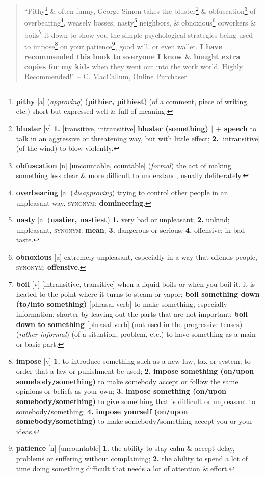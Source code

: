 \documentclass[oneside]{book}
\numberwithin{equation}{section}
\begin{document}
\begin{quotation}
	``Pithy\footnote{\textbf{pithy} [a] (\textit{approving}) (\textbf{pithier, pithiest}) (of a comment, piece of writing, etc.) short but expressed well \& full of meaning.} \& often funny, George Simon takes the bluster\footnote{\textbf{bluster} [v] \textbf{1.} [transitive, intransitive] \textbf{bluster (something) $|$ $+$ speech} to talk in an aggressive or threatening way, but with little effect; \textbf{2.} [intransitive] (of the wind) to blow violently.} \& obfuscation\footnote{\textbf{obfuscation} [n] [uncountable, countable] (\textit{formal}) the act of making something less clear \& more difficult to understand, usually deliberately.} of overbearing\footnote{\textbf{overbearing} [a] (\textit{disapproving}) trying to control other people in an unpleasant way, \textsc{synonym}: \textbf{domineering}.}, weasely bosses, nasty\footnote{\textbf{nasty} [a] (\textbf{nastier, nastiest}) \textbf{1.} very bad or unpleasant; \textbf{2.} unkind; unpleasant, \textsc{synonym}: \textbf{mean}; \textbf{3.} dangerous or serious; \textbf{4.} offensive; in bad taste.} neighbors, \& obnoxious\footnote{\textbf{obnoxious} [a] extremely unpleasant, especially in a way that offends people, \textsc{synonym}: \textbf{offensive}.} coworkers \& boils\footnote{\textbf{boil} [v] [intransitive, transitive] when a liquid boils or when you boil it, it is heated to the point where it turns to steam or vapor; \textbf{boil something down (to\texttt{/}into something)} [phrasal verb] to make something, especially information, shorter by leaving out the parts that are not important; \textbf{boil down to something} [phrasal verb] (not used in the progressive tenses) (\textit{rather informal}) (of a situation, problem, etc.) to have something as a main or basic part.} it down to show you the simple psychological strategies being used to impose\footnote{\textbf{impose} [v] \textbf{1.} to introduce something such as a new law, tax or system; to order that a law or punishment be used; \textbf{2.} \textbf{impose something (on\texttt{/}upon somebody\texttt{/}something)} to make somebody accept or follow the same opinions or beliefs as your own; \textbf{3.} \textbf{impose something (on\texttt{/}upon somebody\texttt{/}something)} to give something that is difficult or unpleasant to somebody\texttt{/}something; \textbf{4.} \textbf{impose yourself (on\texttt{/}upon somebody\texttt{/}something)} to make somebody\texttt{/}something accept you or your ideas.} on your patience\footnote{\textbf{patience} [n] [uncountable] \textbf{1.} the ability to stay calm \& accept delay, problems or suffering without complaining; \textbf{2.} the ability to spend a lot of time doing something difficult that needs a lot of attention \& effort.}, good will, or even wallet. \textbf{I have recommended this book to everyone I know \& bought extra copies for my kids} when they went out into the work world. Highly Recommended!'' -- C. MacCallum, Online Purchaser
\end{quotation}
\end{document}

